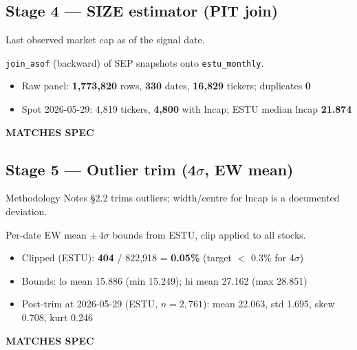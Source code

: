 \documentclass[11pt,a4paper]{article}
\newcommand{\PASS}[1]{\textcolor{pass}{\textbf{#1}}}
\begin{document}
\subsection{Stage 4 --- SIZE estimator (PIT join)}

\begin{description}[style=nextline]
  \item[PDF SPEC] Last observed market cap as of the signal date.
  \item[Implementation] \texttt{join\_asof} (backward) of SEP snapshots onto \texttt{estu\_monthly}.
  \item[Observed]\phantom{x}
    \begin{itemize}[nosep, topsep=-\parskip]
      \item Raw panel: \textbf{1{,}773{,}820} rows, \textbf{330} dates, \textbf{16{,}829} tickers; duplicates \textbf{0}
      \item Spot 2026-05-29: 4{,}819 tickers, \textbf{4{,}800} with lncap; ESTU median lncap \textbf{21.874}
    \end{itemize}
  \item[Status] \PASS{MATCHES SPEC}
\end{description}

\subsection{Stage 5 --- Outlier trim (4$\sigma$, EW mean)}

\begin{description}[style=nextline]
  \item[PDF SPEC] Methodology Notes \S2.2 trims outliers; width/centre for lncap is a documented deviation.
  \item[Implementation] Per-date EW mean $\pm\,4\sigma$ bounds from ESTU, clip applied to all stocks.
  \item[Observed]\phantom{x}
    \begin{itemize}[nosep, topsep=-\parskip]
      \item Clipped (ESTU): \textbf{404} / 822{,}918 = \textbf{0.05\%} (target $<$ 0.3\% for 4$\sigma$)
      \item Bounds: lo mean 15.886 (min 15.249); hi mean 27.162 (max 28.851)
      \item Post-trim at 2026-05-29 (ESTU, $n=2{,}761$): mean 22.063, std 1.695, skew 0.708, kurt 0.246
    \end{itemize}
  \item[Status] \PASS{MATCHES SPEC}
\end{description}
\end{document}
